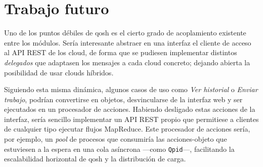 \begin{description}
\end{description}

\section*{Trabajo futuro}\label{sec:directricesfuturo}
\noindent Uno de los puntos d\'ebiles de qosh es el cierto grado de acoplamiento existente entre los m\'odulos. Ser\'ia interesante abstraer en una interfaz el cliente de acceso al API REST de los cloud, de forma que se pudiesen implementar distintos \emph{delegados} que adaptasen los mensajes a cada cloud concreto; dejando abierta la posibilidad de usar clouds h\'ibridos. \newline

Siguiendo esta misma din\'amica, algunos casos de uso como \emph{Ver historial} o \emph{Enviar trabajo}, podr\'ian convertirse en objetos, desvincularse de la interfaz web y ser ejecutados en un procesador de acciones. Habiendo desligado estas acciones de la interfaz, ser\'ia sencillo implementar un API REST propio que permitiese a clientes de cualquier tipo ejecutar flujos MapReduce. Este procesador de acciones ser\'ia, por ejemplo, un \emph{pool} de procesos que consumir\'ia las acciones-objeto que estuviesen a la espera en una cola as\'incrona ---como \texttt{Qpid}---, facilitando la escalabilidad horizontal de qosh y la distribuci\'on de carga. 


